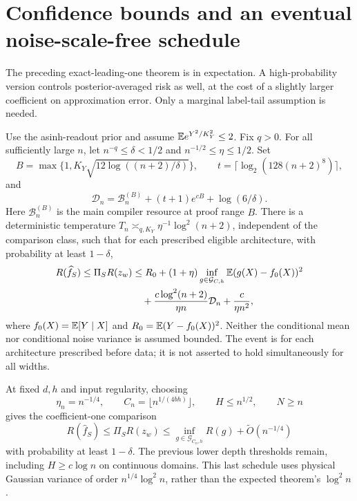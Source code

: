 \section{Confidence bounds and an eventual noise-scale-free schedule}
\label{sec:asinh-confidence}
The preceding exact-leading-one theorem is in expectation.  A
high-probability version controls posterior-averaged risk as well, at
the cost of a slightly larger coefficient on approximation error.
Only a marginal label-tail assumption is needed.

\begin{corollary}
\label{cor:asinh-width-confidence}
Use the asinh-readout prior and assume
$\mathbb E e^{Y^2/K_Y^2}\le2$.  Fix $q>0$.  For all sufficiently large $n$,
let $n^{-q}\le\delta<1/2$ and $n^{-1/2}\le\eta\le1/2$.
Set
\[
 B=\max\{1,K_Y\sqrt{12\log((n+2)/\delta)}\},\qquad
 t=\lceil\log_2(128(n+2)^8)\rceil,
\]
and
\[
 \mathcal D_n=\mathcal B_n^{(B)}+(t+1)e^{cB}
                         +\log(6/\delta).
\]
Here $\mathcal B_n^{(B)}$ is the main compiler resource at proof range
$B$.  There is a deterministic temperature
$T_n\asymp_{q,K_Y}\eta^{-1}\log^2(n+2)$, independent of the
comparison class, such that for each prescribed eligible architecture,
with probability at least $1-\delta$,
\begin{align}\label{eq:asinh-width-confidence}
 R(\widehat f_S)\le\Pi_S R(z_w)
 &\le R_0+(1+\eta)\inf_{g\in\mathcal G_{C,h}}
                           \mathbb E(g(X)-f_0(X))^2\notag\\
 &\quad+\frac{c\log^2(n+2)}{\eta n}\mathcal D_n
                         +\frac{c}{\eta n^2},
\end{align}
where $f_0(X)=\mathbb E[Y\mid X]$ and $R_0=\mathbb E(Y-f_0(X))^2$.
Neither the conditional mean nor conditional noise variance is assumed
bounded.  The event is for each architecture prescribed before data;
it is not asserted to hold simultaneously for all widths.

At fixed $d,h$ and input regularity, choosing
\[
 \eta_n=n^{-1/4},\qquad C_n=\lfloor n^{1/(4bh)}\rfloor,\qquad
 H\le n^{1/2},\qquad N\ge n
\]
gives the coefficient-one comparison
\[
 R(\widehat f_S)\le\Pi_S R(z_w)
       \le\inf_{g\in\mathcal G_{C_n,h}}R(g)
                               +\widetilde O(n^{-1/4})
\]
with probability at least $1-\delta$.  The previous lower depth
thresholds remain, including $H\ge c\log n$ on continuous domains.
This last schedule uses physical Gaussian variance of order
$n^{1/4}\log^2 n$, rather than the expected theorem's $\log^2 n$.
\end{corollary}
